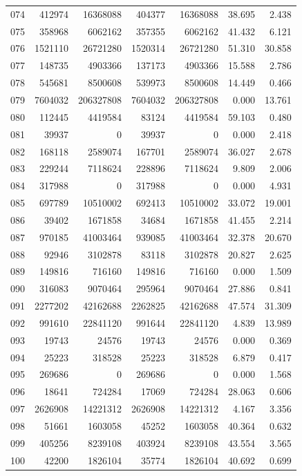 \begin{longtable}{lrrrrrr}
074 & 412974 & 16368088 & 404377 & 16368088 & 38.695 & 2.438\\
075 & 358968 & 6062162 & 357355 & 6062162 & 41.432 & 6.121\\
076 & 1521110 & 26721280 & 1520314 & 26721280 & 51.310 & 30.858\\
077 & 148735 & 4903366 & 137173 & 4903366 & 15.588 & 2.786\\
078 & 545681 & 8500608 & 539973 & 8500608 & 14.449 & 0.466\\
079 & 7604032 & 206327808 & 7604032 & 206327808 & 0.000 & 13.761\\
080 & 112445 & 4419584 & 83124 & 4419584 & 59.103 & 0.480\\
081 & 39937 & 0 & 39937 & 0 & 0.000 & 2.418\\
082 & 168118 & 2589074 & 167701 & 2589074 & 36.027 & 2.678\\
083 & 229244 & 7118624 & 228896 & 7118624 & 9.809 & 2.006\\
084 & 317988 & 0 & 317988 & 0 & 0.000 & 4.931\\
085 & 697789 & 10510002 & 692413 & 10510002 & 33.072 & 19.001\\
086 & 39402 & 1671858 & 34684 & 1671858 & 41.455 & 2.214\\
087 & 970185 & 41003464 & 939085 & 41003464 & 32.378 & 20.670\\
088 & 92946 & 3102878 & 83118 & 3102878 & 20.827 & 2.625\\
089 & 149816 & 716160 & 149816 & 716160 & 0.000 & 1.509\\
090 & 316083 & 9070464 & 295964 & 9070464 & 27.886 & 0.841\\
091 & 2277202 & 42162688 & 2262825 & 42162688 & 47.574 & 31.309\\
092 & 991610 & 22841120 & 991644 & 22841120 & 4.839 & 13.989\\
093 & 19743 & 24576 & 19743 & 24576 & 0.000 & 0.369\\
094 & 25223 & 318528 & 25223 & 318528 & 6.879 & 0.417\\
095 & 269686 & 0 & 269686 & 0 & 0.000 & 1.568\\
096 & 18641 & 724284 & 17069 & 724284 & 28.063 & 0.606\\
097 & 2626908 & 14221312 & 2626908 & 14221312 & 4.167 & 3.356\\
098 & 51661 & 1603058 & 45252 & 1603058 & 40.364 & 0.632\\
099 & 405256 & 8239108 & 403924 & 8239108 & 43.554 & 3.565\\
100 & 42200 & 1826104 & 35774 & 1826104 & 40.692 & 0.699\\
\end{longtable}

